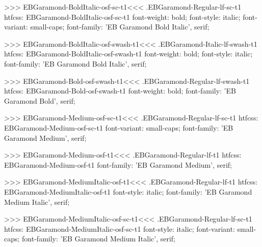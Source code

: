 {{{{{{{>>>
\<EBGaramond-BoldItalic-osf-sc-t1\><<<
.EBGaramond-Regular-lf-sc-t1
htfcss:  EBGaramond-BoldItalic-osf-sc-t1  font-weight: bold; font-style: italic; font-variant: small-caps; font-family: 'EB Garamond Bold Italic', serif;

>>>
\<EBGaramond-BoldItalic-osf-swash-t1\><<<
.EBGaramond-Italic-lf-swash-t1
htfcss:  EBGaramond-BoldItalic-osf-swash-t1  font-weight: bold; font-style: italic; font-family: 'EB Garamond Bold Italic', serif;

>>>
\<EBGaramond-Bold-osf-swash-t1\><<<
.EBGaramond-Regular-lf-swash-t1
htfcss:  EBGaramond-Bold-osf-swash-t1  font-weight: bold; font-family: 'EB Garamond Bold', serif;

>>>
\<EBGaramond-Medium-osf-sc-t1\><<<
.EBGaramond-Regular-lf-sc-t1
htfcss:  EBGaramond-Medium-osf-sc-t1  font-variant: small-caps; font-family: 'EB Garamond Medium', serif;

>>>
\<EBGaramond-Medium-osf-t1\><<<
.EBGaramond-Regular-lf-t1
htfcss:  EBGaramond-Medium-osf-t1  font-family: 'EB Garamond Medium', serif;

>>>
\<EBGaramond-MediumItalic-osf-t1\><<<
.EBGaramond-Regular-lf-t1
htfcss:  EBGaramond-MediumItalic-osf-t1  font-style: italic; font-family: 'EB Garamond Medium Italic', serif;

>>>
\<EBGaramond-MediumItalic-osf-sc-t1\><<<
.EBGaramond-Regular-lf-sc-t1
htfcss:  EBGaramond-MediumItalic-osf-sc-t1  font-style: italic; font-variant: small-caps; font-family: 'EB Garamond Medium Italic', serif;

}}}}}}}
